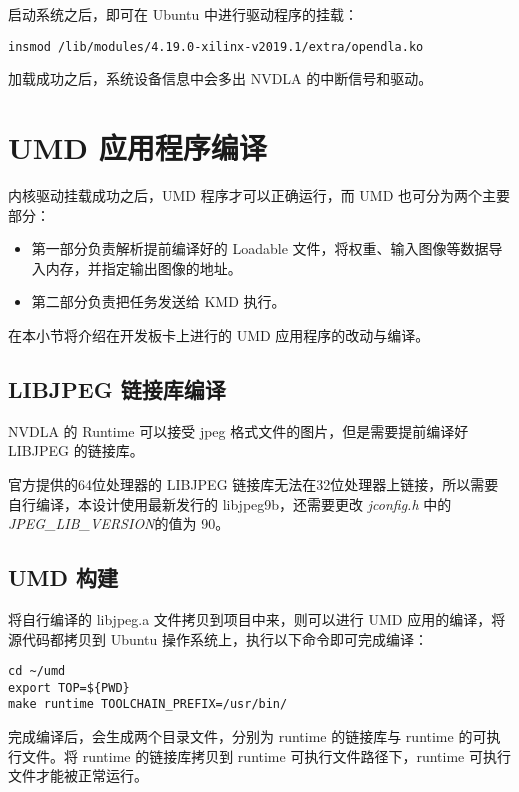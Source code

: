 启动系统之后，即可在 Ubuntu 中进行驱动程序的挂载：

\begin{lstlisting}
insmod /lib/modules/4.19.0-xilinx-v2019.1/extra/opendla.ko 
\end{lstlisting}

加载成功之后，系统设备信息中会多出 NVDLA 的中断信号和驱动。

\section{UMD 应用程序编译}

内核驱动挂载成功之后，UMD 程序才可以正确运行，而 UMD 也可分为两个主要部分：

\begin{itemize}
    \item 第一部分负责解析提前编译好的 Loadable 文件，将权重、输入图像等数据导入内存，并指定输出图像的地址。
    \item 第二部分负责把任务发送给 KMD 执行。
\end{itemize}

在本小节将介绍在开发板卡上进行的 UMD 应用程序的改动与编译。

\subsection{LIBJPEG 链接库编译}

NVDLA 的 Runtime 可以接受 jpeg 格式文件的图片，但是需要提前编译好 LIBJPEG 的链接库。

官方提供的64位处理器的 LIBJPEG 链接库无法在32位处理器上链接，所以需要自行编译，本设计使用最新发行的 libjpeg9b，还需要更改 \emph{jconfig.h} 中的 \emph{JPEG\_LIB\_VERSION}的值为 90。

\subsection{UMD 构建}

将自行编译的 libjpeg.a 文件拷贝到项目中来，则可以进行 UMD 应用的编译，将源代码都拷贝到 Ubuntu 操作系统上，执行以下命令即可完成编译：

\begin{lstlisting}
cd ~/umd
export TOP=${PWD}
make runtime TOOLCHAIN_PREFIX=/usr/bin/
\end{lstlisting}

完成编译后，会生成两个目录文件，分别为 runtime 的链接库与 runtime 的可执行文件。将 runtime 的链接库拷贝到 runtime 可执行文件路径下，runtime 可执行文件才能被正常运行。

